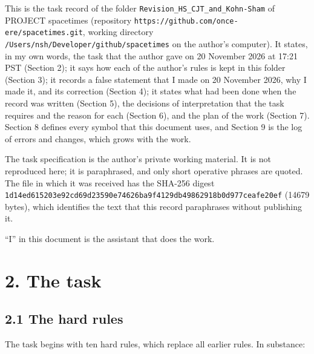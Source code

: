 \documentclass[
  10pt,
]{article}
\begin{document}
This is the task record of the folder
\texttt{Revision\_HS\_CJT\_and\_Kohn-Sham} of PROJECT spacetimes
(repository \texttt{https://github.com/once-ere/spacetimes.git}, working
directory \texttt{/Users/nsh/Developer/github/spacetimes} on the
author's computer). It states, in my own words, the task that the author
gave on 20 November 2026 at 17:21 PST (Section 2); it says how each of
the author's rules is kept in this folder (Section 3); it records a
false statement that I made on 20 November 2026, why I made it, and its
correction (Section 4); it states what had been done when the record was
written (Section 5), the decisions of interpretation that the task
requires and the reason for each (Section 6), and the plan of the work
(Section 7). Section 8 defines every symbol that this document uses, and
Section 9 is the log of errors and changes, which grows with the work.

The task specification is the author's private working material. It is
not reproduced here; it is paraphrased, and only short operative phrases
are quoted. The file in which it was received has the SHA-256 digest
\texttt{1d14ed615203e92cd69d23590e74626ba9f4129db49862918b0d977ceafe20ef}
(14679 bytes), which identifies the text that this record paraphrases
without publishing it.

``I'' in this document is the assistant that does the work.

\hypertarget{the-task}{%
\section{2. The task}\label{the-task}}

\hypertarget{the-hard-rules}{%
\subsection{2.1 The hard rules}\label{the-hard-rules}}

The task begins with ten hard rules, which replace all earlier rules. In
substance:
\end{document}
